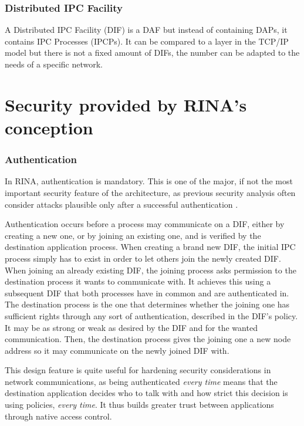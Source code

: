 \documentclass[a4paper]{proc}
\begin{document}
\section{Distributed IPC Facility}
A Distributed IPC Facility (DIF) is a DAF but instead of containing DAPs, it contains IPC Processes (IPCPs).
It can be compared to a layer in the TCP/IP model but there is not a fixed amount of DIFs, the number can be adapted to the needs of a specific network.

\part{Security provided by RINA's conception}
\section{Authentication}

\par In RINA, authentication is mandatory. This is one of the major, if not the
most important security feature of the architecture, as previous security
analysis often consider attacks plausible only after a successful authentication
\cite{assessing-security, wiki, PINS}.

\par Authentication occurs before a process may communicate on a DIF, either by
creating a new one, or by joining an existing one, and is verified by the
destination application process. When creating a brand new DIF, the initial IPC
process simply has to exist in order to let others join the newly created DIF.
When joining an already existing DIF, the joining process asks permission to the
destination process it wants to communicate with. It achieves this using a
subsequent DIF that both processes have in common and are authenticated in.
The destination process is the one that determines whether the joining one has
sufficient rights through any sort of authentication, described in the DIF's
policy. It may be as strong or weak as desired by the DIF and for the wanted
communication. Then, the destination process gives the joining one a new
node address so it may communicate on the newly joined DIF with.

\par This design feature is quite useful for hardening security considerations
in network communications, as being authenticated \textit{every time} means that
the destination application decides who to talk with and how strict this
decision is using policies, \textit{every time}. It thus builds greater trust
between applications through native access control.
\end{document}
